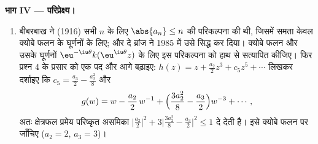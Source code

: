 \begin{problem}
\medskip
\noindent\textbf{भाग IV --- परिप्रेक्ष्य।}
\begin{enumerate}[resume]
  \item बीबरबाख ने (1916) सभी $n$ के लिए $\abs{a_n} \leq n$ की परिकल्पना की
        थी, जिसमें समता केवल क्योबे फलन के घूर्णनों के लिए; और
        दे ब्रांज ने 1985 में उसे सिद्ध कर दिया। क्योबे फलन और
        उसके घूर्णनों $\eu^{-\iu\theta}k(\eu^{\iu\theta}z)$ के लिए इस परिकल्पना को हाथ से
        सत्यापित कीजिए। फिर प्रश्न 4 के प्रसार को एक पद और आगे
        बढ़ाइए: $h(z) = z + \frac{a_2}2z^3 + c_5z^5 + \cdots$ लिखकर दर्शाइए कि $c_5 = \frac{a_3}2 - \frac{a_2^2}8$ और
        \[
        g(w) = w - \frac{a_2}{2}\,w^{-1} +
        \Bigl(\frac{3a_2^2}8 - \frac{a_3}2\Bigr)w^{-3} +
        \cdots ,
        \]
        अतः क्षेत्रफल प्रमेय परिष्कृत असमिका $\bigl|\frac{a_2}2\bigr|^2 + 3\bigl|\frac{3a_2^2}8 -
        \frac{a_3}2\bigr|^2 \leq 1$ दे देती है।
        इसे क्योबे फलन पर जाँचिए ($a_2 = 2$, $a_3 = 3$)।
\end{enumerate}


\end{problem}
